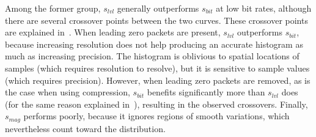Among the former group, $s_{lvl}$ generally outperforms $s_{bit}$ at low bit rates, although there
are several crossover points between the two curves. These crossover points are explained
in~. When leading zero packets are present, $s_{lvl}$
outperforms $s_{bit}$, because increasing resolution does
not help producing an accurate histogram as much as increasing precision. The histogram is oblivious
to spatial locations of samples (which requires resolution to resolve), but it is sensitive to
sample values (which requires precision). However, when leading zero packets are removed, as is the
case when using compression, $s_{bit}$ benefits significantly more than $s_{lvl}$ does (for the same
reason explained in~), resulting in the observed crossovers. Finally,
$s_{mag}$ performs poorly, because it ignores regions of smooth variations, which nevertheless count
toward the distribution.

